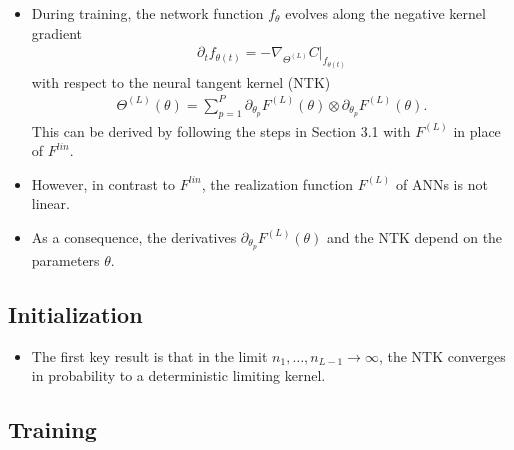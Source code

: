 \documentclass[10pt]{article}
\newcommand{\paran}[1]{{( #1 )}}
\begin{document}
\begin{itemize}
\item During training, the network function $f_\theta$ evolves along the negative kernel gradient
\begin{align*}
\partial_t f_{\theta(t)} = -\nabla_{\Theta^\paran{L}} C|_{f_{\theta(t)}}
\end{align*}
with respect to the neural tangent kernel (NTK)
\begin{align*}
\Theta^\paran{L}(\theta) = \sum_{p = 1}^P \partial_{\theta_p} F^\paran{L}(\theta) \otimes \partial_{\theta_p} F^\paran{L}(\theta).
\end{align*}
This can be derived by following the steps in Section 3.1 with $F^\paran{L}$ in place of $F^{lin}$.
\item However, in contrast to $F^{lin}$, the realization function $F^\paran{L}$ of ANNs is not linear.
\item As a consequence, the derivatives $\partial_{\theta_p} F^\paran{L}(\theta)$ and the NTK depend on the parameters $\theta$.
\end{itemize}

\subsection{Initialization}

\begin{itemize}
\item The first key result is that in the limit $n_1, \ldots, n_{L - 1} \rightarrow \infty$, the NTK converges in probability to a deterministic limiting kernel.
\end{itemize}

\subsection{Training}
\end{document}
